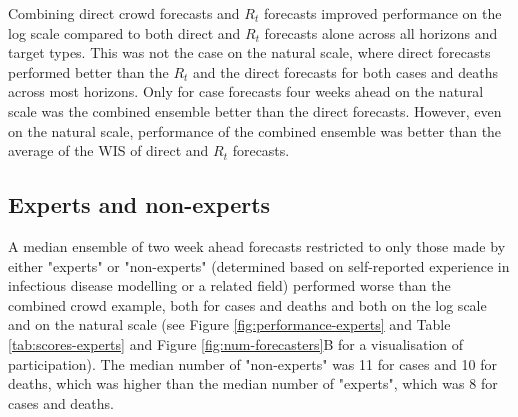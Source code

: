 \documentclass[10pt,a4paper,twocolumn]{article}
\begin{document}
Combining direct crowd forecasts and $R_t$ forecasts improved performance on the log scale compared to both direct and $R_t$ forecasts alone across all horizons and target types. This was not the case on the natural scale, where direct forecasts performed better than the $R_t$ and the direct forecasts for both cases and deaths across most horizons. Only for case forecasts four weeks ahead on the natural scale was the combined ensemble better than the direct forecasts. However, even on the natural scale, performance of the combined ensemble was better than the average of the WIS of direct and $R_t$ forecasts. 





\subsection*{Experts and non-experts}


A median ensemble of two week ahead forecasts restricted to only those made by either "experts" or "non-experts" (determined based on self-reported experience in infectious disease modelling or a related field) performed worse than the combined crowd example, both for cases and deaths and both on the log scale and on the natural scale (see Figure \ref{fig:performance-experts} and Table \ref{tab:scores-experts} and Figure \ref{fig:num-forecasters}B for a visualisation of participation). The median number of "non-experts" was 11 for cases and 10 for deaths, which was higher than the median number of "experts", which was 8 for cases and deaths. 
\end{document}
